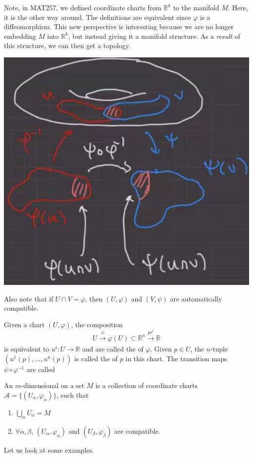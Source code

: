 \documentclass{article}
\numberwithin{equation}{section}
\begin{document}
Note, in MAT257, we defined coordinate charts from $\mathbb{R}^k$ to the manifold $M$. Here, it is the other way around. The definitions are equivalent since $\varphi$ is a diffeomorphism. This new perspective is interesting because we are no longer embedding $M$ into $\mathbb{R}^k$, but instead giving it a manifold structure. As a \textit{result} of this structure, we can then get a topology.
\begin{center}
    \includegraphics[width=0.4\linewidth]{L2.png}
\end{center}
Also note that if $U\cap V = \varphi$, then $(U,\varphi)$ and $(V,\psi)$ are automatically compatible.
\begin{definition}
    Given a chart $(U,\varphi)$, the composition
\begin{equation}
    U \xrightarrow[]{\varphi} \varphi(U) \subset \mathbb{R}^n \xrightarrow[]{pr^i}\mathbb{R}
\end{equation}
is equivalent to $u^i: U \rightarrow \mathbb{R}$ and are called the  of $\varphi$. Given $p\in U$, the $n$-tuple $(u^1(p),\dots,u^n(p))$ is called the  of $p$ in this chart. The transition maps $\psi \circ \varphi^{-1}$ are called 
\end{definition}
\begin{definition}
    An $m$-dimensional  on a set $M$ is a collection of coordinate charts $\mathcal{A} = \{(U_\alpha,\varphi_\alpha)\}$, such that 
    \begin{enumerate}
        \item $\bigcup_\alpha U_\alpha = M$
        \item $\forall \alpha,\beta$, $(U_\alpha,\varphi_\alpha)$ and $(U_\beta,\varphi_\beta)$ are compatible.
    \end{enumerate}
\end{definition}
Let us look at some examples.
\end{document}
